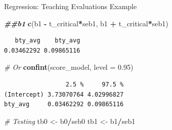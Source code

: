 \documentclass[
  ignorenonframetext,
]{beamer}
\newenvironment{Shaded}{\begin{snugshade}}{\end{snugshade}}
\newcommand{\AttributeTok}[1]{\textcolor[rgb]{0.13,0.29,0.53}{#1}}
\newcommand{\CommentTok}[1]{\textcolor[rgb]{0.56,0.35,0.01}{\textit{#1}}}
\newcommand{\DocumentationTok}[1]{\textcolor[rgb]{0.56,0.35,0.01}{\textbf{\textit{#1}}}}
\newcommand{\FloatTok}[1]{\textcolor[rgb]{0.00,0.00,0.81}{#1}}
\newcommand{\FunctionTok}[1]{\textcolor[rgb]{0.13,0.29,0.53}{\textbf{#1}}}
\newcommand{\NormalTok}[1]{#1}
\newcommand{\OtherTok}[1]{\textcolor[rgb]{0.56,0.35,0.01}{#1}}
\newcommand{\SpecialCharTok}[1]{\textcolor[rgb]{0.81,0.36,0.00}{\textbf{#1}}}
\begin{document}
\begin{frame}[fragile]{Regression: Teaching Evaluations Example}
\protect{}\label{regression-teaching-evaluations-example-12}
\normalsize

\begin{Shaded}
\begin{Highlighting}[]
\DocumentationTok{\#\#b1}
\FunctionTok{c}\NormalTok{(b1 }\SpecialCharTok{{-}}\NormalTok{ t\_critical}\SpecialCharTok{*}\NormalTok{seb1, b1 }\SpecialCharTok{+}\NormalTok{ t\_critical}\SpecialCharTok{*}\NormalTok{seb1)}
\end{Highlighting}
\end{Shaded}

\begin{verbatim}
   bty_avg    bty_avg 
0.03462292 0.09865116 
\end{verbatim}

\begin{Shaded}
\begin{Highlighting}[]
\CommentTok{\# Or}
\FunctionTok{confint}\NormalTok{(score\_model, }\AttributeTok{level =} \FloatTok{0.95}\NormalTok{)}
\end{Highlighting}
\end{Shaded}

\begin{verbatim}
                 2.5 %     97.5 %
(Intercept) 3.73070764 4.02996827
bty_avg     0.03462292 0.09865116
\end{verbatim}

\begin{Shaded}
\begin{Highlighting}[]
\CommentTok{\# Testing}
\NormalTok{tb0 }\OtherTok{\textless{}{-}}\NormalTok{ b0}\SpecialCharTok{/}\NormalTok{seb0}
\NormalTok{tb1 }\OtherTok{\textless{}{-}}\NormalTok{ b1}\SpecialCharTok{/}\NormalTok{seb1}
\end{Highlighting}
\end{Shaded}

\normalsize
\end{frame}
\end{document}
